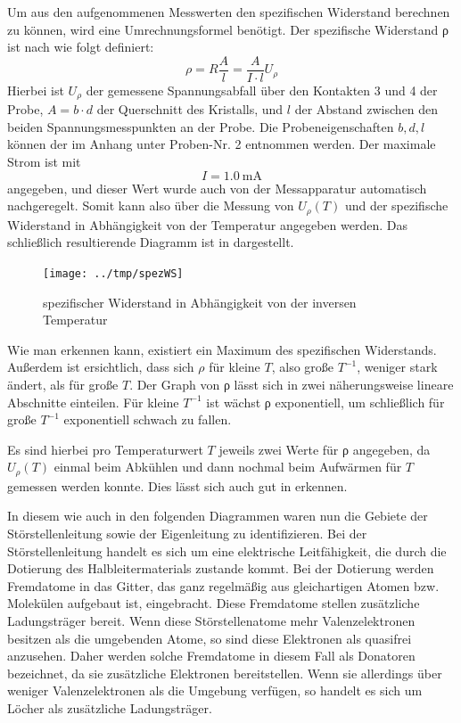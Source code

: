 Um aus den aufgenommenen Messwerten den spezifischen Widerstand berechnen zu
können, wird eine Umrechnungsformel benötigt. Der spezifische Widerstand ρ ist
nach \cite[Gl. (12.30)]{ibach}wie folgt definiert:
\begin{equation}
ρ = R\frac{A}{l} = \frac{A}{I\cdot l} U_ρ
\label{eqn:rho}
\end{equation}
Hierbei ist $U_ρ$ der gemessene Spannungsabfall über den Kontakten 3 und 4 der Probe,
$A= b\cdot d$ der Querschnitt des Kristalls, und $l$ der Abstand zwischen den
beiden Spannungsmesspunkten an der Probe. Die Probeneigenschaften $b, d, l$ können
der  im Anhang unter Proben-Nr. 2 entnommen werden.
Der maximale Strom ist mit
\begin{equation}
 I = \SI{1,0}{\milli\ampere} 
\end{equation}
angegeben, und dieser Wert wurde auch von der Messapparatur automatisch nachgeregelt.
Somit kann also über die Messung von $U_ρ(T)$ und  der spezifische Widerstand in
Abhängigkeit von der Temperatur angegeben werden. Das schließlich resultierende
Diagramm ist in  dargestellt.

\begin{figure}[htb]
   \centering
   \texttt{[image: ../tmp/spezWS]}
   \caption{spezifischer Widerstand in Abhängigkeit von der inversen Temperatur}
   \label{fig:spezWS}
\end{figure}

Wie man erkennen kann, existiert ein Maximum des spezifischen Widerstands.
Außerdem ist ersichtlich, dass sich $ρ$ für kleine $T$, also große $T^{-1}$,
weniger stark ändert, als für große $T$.
Der Graph von ρ lässt sich in zwei
näherungsweise lineare Abschnitte einteilen. Für kleine $T^{-1}$ ist wächst ρ
exponentiell, um schließlich für große $T^{-1}$ exponentiell schwach zu fallen.

Es sind hierbei pro Temperaturwert $T$ jeweils zwei Werte für ρ angegeben, da $U_ρ(T)$
einmal beim Abkühlen und dann nochmal beim Aufwärmen für $T$ gemessen werden konnte.
Dies lässt sich auch gut in  erkennen.

In diesem wie auch in den folgenden Diagrammen waren nun die Gebiete der
Störstellenleitung sowie der Eigenleitung zu identifizieren. Bei der
Störstellenleitung handelt es sich um eine elektrische Leitfähigkeit, die durch
die Dotierung des Halbleitermaterials zustande kommt. Bei der Dotierung werden
Fremdatome in das Gitter, das ganz regelmäßig aus gleichartigen Atomen bzw.
Molekülen aufgebaut ist, eingebracht. Diese Fremdatome stellen zusätzliche
Ladungsträger bereit. Wenn diese Störstellenatome mehr Valenzelektronen besitzen
als die umgebenden Atome, so sind diese Elektronen als quasifrei anzusehen.
Daher werden solche Fremdatome in diesem Fall als Donatoren bezeichnet, da sie
zusätzliche Elektronen bereitstellen. Wenn sie allerdings über weniger
Valenzelektronen als die Umgebung verfügen, so handelt es sich um Löcher als
zusätzliche Ladungsträger.

